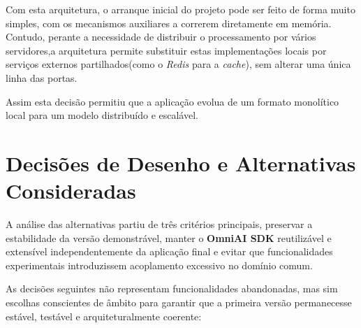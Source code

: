 Com esta arquitetura, o arranque inicial do projeto pode ser feito de forma muito simples, com os mecanismos auxiliares a correrem diretamente em memória. Contudo, perante a necessidade de distribuir o processamento por vários servidores,a arquitetura permite substituir estas implementações locais por serviços externos partilhados(como o \textit{Redis}\cite{ref_redis} para a \textit{cache}), sem alterar uma única linha das portas.

Assim esta decisão permitiu que a aplicação evolua de um formato monolítico local para um modelo distribuído e escalável.

\section{Decisões de Desenho e Alternativas Consideradas}

A análise das alternativas partiu de três critérios principais, preservar a estabilidade da versão demonstrável, manter o \textbf{OmniAI SDK} reutilizável e extensível independentemente da aplicação final e evitar que funcionalidades experimentais introduzissem acoplamento excessivo no domínio comum.

As decisões seguintes não representam funcionalidades abandonadas, mas sim escolhas conscientes de âmbito para garantir que a primeira versão permanecesse estável, testável e arquiteturalmente coerente:

